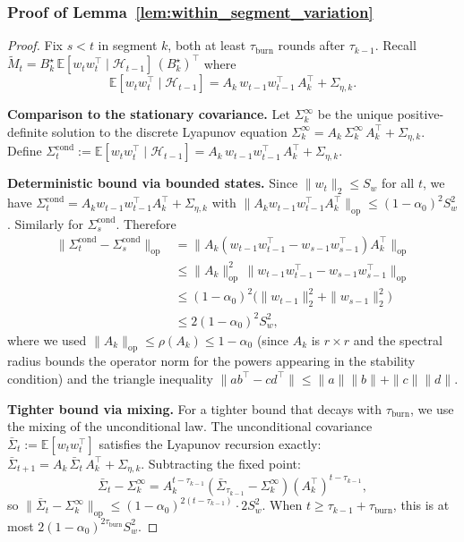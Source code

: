 \documentclass{article}
\newcommand{\E}{\mathbb{E}}
\newcommand{\op}{\mathrm{op}}
\newcommand{\cH}{\mathcal{H}}
\begin{document}
\subsubsection{Proof of Lemma~\ref{lem:within_segment_variation}}
\label{proof:within_segment_variation}

\begin{proof}
Fix $s < t$ in segment $k$, both at least $\tau_{\mathrm{burn}}$ rounds after $\tau_{k-1}$.  Recall $\widetilde M_t = B_k^\star\,\E[w_t w_t^\top \mid \cH_{t-1}]\,(B_k^\star)^\top$ where
\[
\E[w_t w_t^\top \mid \cH_{t-1}] = A_k\,w_{t-1}w_{t-1}^\top\,A_k^\top + \Sigma_{\eta,k}.
\]

\textbf{Comparison to the stationary covariance.}
Let $\Sigma_k^\infty$ be the unique positive-definite solution to the discrete Lyapunov equation $\Sigma_k^\infty = A_k\,\Sigma_k^\infty\,A_k^\top + \Sigma_{\eta,k}$.  Define $\Sigma_t^{\mathrm{cond}} := \E[w_t w_t^\top \mid \cH_{t-1}] = A_k\,w_{t-1}w_{t-1}^\top\,A_k^\top + \Sigma_{\eta,k}$.

\textbf{Deterministic bound via bounded states.}
Since $\|w_t\|_2 \le S_w$ for all $t$, we have $\Sigma_t^{\mathrm{cond}} = A_k w_{t-1}w_{t-1}^\top A_k^\top + \Sigma_{\eta,k}$ with $\|A_k w_{t-1}w_{t-1}^\top A_k^\top\|_{\op} \le (1-\alpha_0)^2 S_w^2$.  Similarly for $\Sigma_s^{\mathrm{cond}}$.  Therefore
\begin{align*}
\|\Sigma_t^{\mathrm{cond}} - \Sigma_s^{\mathrm{cond}}\|_{\op}
&= \|A_k(w_{t-1}w_{t-1}^\top - w_{s-1}w_{s-1}^\top)A_k^\top\|_{\op} \\
&\le \|A_k\|_{\op}^2\,\|w_{t-1}w_{t-1}^\top - w_{s-1}w_{s-1}^\top\|_{\op} \\
&\le (1-\alpha_0)^2\bigl(\|w_{t-1}\|_2^2 + \|w_{s-1}\|_2^2\bigr) \\
&\le 2(1-\alpha_0)^2 S_w^2,
\end{align*}
where we used $\|A_k\|_{\op} \le \rho(A_k) \le 1-\alpha_0$ (since $A_k$ is $r\times r$ and the spectral radius bounds the operator norm for the powers appearing in the stability condition) and the triangle inequality $\|ab^\top - cd^\top\| \le \|a\|\|b\| + \|c\|\|d\|$.

\textbf{Tighter bound via mixing.}
For a tighter bound that decays with $\tau_{\mathrm{burn}}$, we use the mixing of the unconditional law.  The unconditional covariance $\bar\Sigma_t := \E[w_tw_t^\top]$ satisfies the Lyapunov recursion exactly: $\bar\Sigma_{t+1} = A_k\,\bar\Sigma_t\,A_k^\top + \Sigma_{\eta,k}$.  Subtracting the fixed point:
\[
\bar\Sigma_t - \Sigma_k^\infty = A_k^{t-\tau_{k-1}}(\bar\Sigma_{\tau_{k-1}} - \Sigma_k^\infty)(A_k^\top)^{t-\tau_{k-1}},
\]
so $\|\bar\Sigma_t - \Sigma_k^\infty\|_{\op} \le (1-\alpha_0)^{2(t-\tau_{k-1})} \cdot 2S_w^2$.  When $t \ge \tau_{k-1} + \tau_{\mathrm{burn}}$, this is at most $2(1-\alpha_0)^{2\tau_{\mathrm{burn}}} S_w^2$.


\end{proof}
\end{document}
